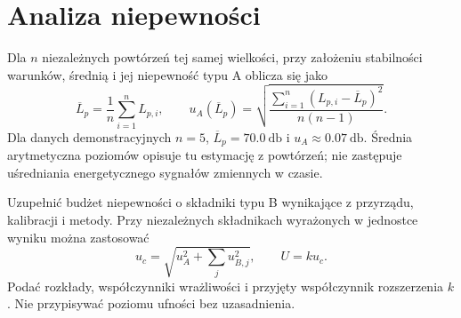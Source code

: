 \section{Analiza niepewności}
\label{sec:niepewnosc}
Dla $n$ niezależnych powtórzeń tej samej wielkości, przy założeniu
stabilności warunków, średnią i jej niepewność typu A oblicza się jako
\begin{equation}
  \overline{L}_p = \frac{1}{n}\sum_{i=1}^{n} L_{p,i},
  \qquad
  u_A(\overline{L}_p) =
  \sqrt{\frac{\sum_{i=1}^{n}(L_{p,i}-\overline{L}_p)^2}{n(n-1)}}.
  \label{eq:niepewnosc}
\end{equation}
Dla danych demonstracyjnych $n=5$, $\overline{L}_p=\qty{70.0}{\decibel}$
i $u_A\approx\qty{0.07}{\decibel}$. Średnia arytmetyczna poziomów
opisuje tu estymację z powtórzeń; nie zastępuje uśredniania energetycznego
sygnałów zmiennych w czasie.

Uzupełnić budżet niepewności o składniki typu B wynikające z przyrządu,
kalibracji i metody. Przy niezależnych składnikach wyrażonych w jednostce
wyniku można zastosować
\begin{equation}
  u_c = \sqrt{u_A^2+\sum_j u_{B,j}^2},\qquad U=k u_c.
\end{equation}
Podać rozkłady, współczynniki wrażliwości i przyjęty współczynnik
rozszerzenia $k$. Nie przypisywać poziomu ufności bez uzasadnienia.
